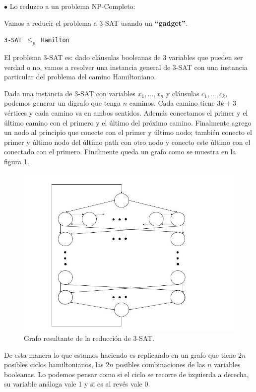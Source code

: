 \documentclass[a4paper,10pt]{article}
\begin{document}
	$\bullet$ Lo reduzco a un problema NP-Completo:

	Vamos a reducir el problema a 3-SAT usando un \textbf{``gadget''}.

	\texttt{3-SAT $\leq_p$ Hamilton}
	\linebreak

	El problema 3-SAT es: dado cláusulas booleanas de 3 variables que pueden ser verdad o no, vamos a resolver una instancia general de 3-SAT con una instancia particular del problema del camino Hamiltoniano.

	Dada una instancia de 3-SAT con variables $x_1, ..., x_n$ y cláusulas $c_1, ..., c_k$, podemos generar un digrafo que tenga $n$ caminos. Cada camino tiene $3k+3$ vértices y cada camino va en ambos sentidos. Además conectamos el primer y el último camino con el primero y el último del próximo camino. Finalmente agrego un nodo al principio que conecte con el primer y último nodo; también conecto el primer y último nodo del último path con otro nodo y conecto este último con el conectado con el primero. Finalmente queda un grafo como se muestra en la figura \ref{fig:punto-3-1}.

	\begin{figure}[!htb]
		\centering
		\includegraphics[scale=0.5]{images/grafo-3-1.jpg}
		\caption{Grafo resultante de la reducción de 3-SAT.}
		\label{fig:punto-3-1}
	\end{figure}

	De esta manera lo que estamos haciendo es replicando en un grafo que tiene $2n$ posibles ciclos hamiltonianos, las $2n$ posibles combinaciones de las $n$ variables booleanas. Lo podemos pensar como si el ciclo se recorre de izquierda a derecha, su variable análoga vale 1 y si es al revés vale 0.
\end{document}
